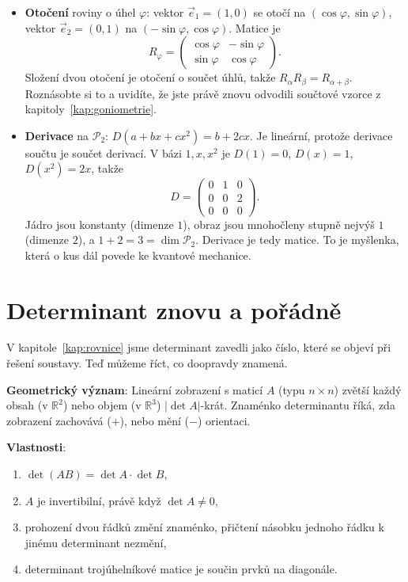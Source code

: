 \begin{example}
  \begin{itemize}
    \item \textbf{Otočení} roviny o úhel $\varphi$: vektor $\vec{e}_1 = (1, 0)$ se otočí na $(\cos\varphi, \sin\varphi)$, vektor $\vec{e}_2 = (0, 1)$ na $(-\sin\varphi, \cos\varphi)$. Matice je
    \begin{equation*}
      R_\varphi = \begin{pmatrix}\cos\varphi & -\sin\varphi\\ \sin\varphi & \cos\varphi\end{pmatrix}.
    \end{equation*}
    Složení dvou otočení je otočení o součet úhlů, takže $R_\alpha R_\beta = R_{\alpha + \beta}$. Roznásobte si to a uvidíte, že jste právě znovu odvodili součtové vzorce z kapitoly~\ref{kap:goniometrie}.
    \item \textbf{Derivace} na $\mathcal{P}_2$: $D(a + bx + cx^2) = b + 2cx$. Je lineární, protože derivace součtu je součet derivací. V bázi $1, x, x^2$ je $D(1) = 0$, $D(x) = 1$, $D(x^2) = 2x$, takže
    \begin{equation*}
      D = \begin{pmatrix} 0 & 1 & 0\\ 0 & 0 & 2\\ 0 & 0 & 0\end{pmatrix}.
    \end{equation*}
    Jádro jsou konstanty (dimenze $1$), obraz jsou mnohočleny stupně nejvýš $1$ (dimenze $2$), a $1 + 2 = 3 = \dim\mathcal{P}_2$. Derivace je tedy matice. To je myšlenka, která o kus dál povede ke kvantové mechanice.
  \end{itemize}
\end{example}

\section{Determinant znovu a pořádně}

V kapitole~\ref{kap:rovnice} jsme determinant zavedli jako číslo, které se objeví při řešení soustavy. Teď můžeme říct, co doopravdy znamená.

\begin{definitionbox}
  \textbf{Geometrický význam}: Lineární zobrazení s maticí $A$ (typu $n\times n$) zvětší každý obsah (v $\mathbb{R}^2$) nebo objem (v $\mathbb{R}^3$) $|\det A|$-krát. Znaménko determinantu říká, zda zobrazení zachovává ($+$), nebo mění ($-$) orientaci.

  \textbf{Vlastnosti}:
  \begin{enumerate}
    \item $\det(AB) = \det A\cdot\det B$,
    \item $A$ je invertibilní, právě když $\det A\neq 0$,
    \item prohození dvou řádků změní znaménko, přičtení násobku jednoho řádku k jinému determinant nezmění,
    \item determinant trojúhelníkové matice je součin prvků na diagonále.
  \end{enumerate}
\end{definitionbox}

